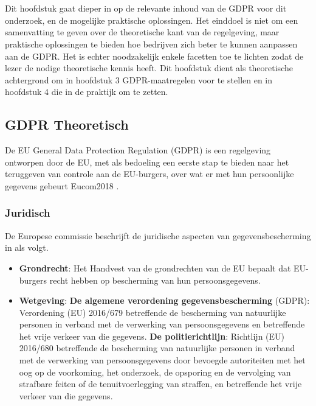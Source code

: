\chapter{}
\label{ch:stand-van-zaken}



Dit hoofdstuk gaat dieper in op de relevante inhoud van de GDPR voor dit onderzoek, en de mogelijke praktische oplossingen. 
Het einddoel is niet om een samenvatting te geven over de theoretische kant van de regelgeving, maar praktische oplossingen te bieden hoe bedrijven zich beter te kunnen aanpassen aan de GDPR. 
Het is echter noodzakelijk enkele facetten toe te lichten zodat de lezer de nodige theoretische kennis heeft.
Dit hoofdstuk dient als theoretische achtergrond om in hoofdstuk 3 GDPR-maatregelen voor te stellen en in hoofdstuk 4 die in de praktijk om te zetten.
 
 
\section{{GDPR Theoretisch}}

De EU General Data Protection Regulation (GDPR) is een regelgeving ontworpen door de EU, met als bedoeling een eerste stap te bieden naar het teruggeven van controle aan de EU-burgers, over wat er met hun persoonlijke gegevens gebeurt Eucom2018 . 

\subsection{Juridisch}
De Europese commissie beschrijft de juridische aspecten van gegevensbescherming in \autocite{Lusignan2014} als volgt.

\begin{itemize}
    \item \textbf{Grondrecht}: Het Handvest van de grondrechten van de EU bepaalt dat EU-burgers recht hebben op bescherming van hun persoonsgegevens.
    \item \textbf{Wetgeving}: 
    \subitem \textbf{De algemene verordening gegevensbescherming} (GDPR): 
    Verordening (EU) 2016/679 betreffende de bescherming van natuurlijke personen in verband met de verwerking van persoonsgegevens en betreffende het vrije verkeer van die gegevens.
    \subitem \textbf{De politierichtlijn}: 
    Richtlijn (EU) 2016/680 betreffende de bescherming van natuurlijke personen in verband met de verwerking van persoonsgegevens door bevoegde autoriteiten met het oog op de voorkoming, het onderzoek, de opsporing en de vervolging van strafbare feiten of de tenuitvoerlegging van straffen, en betreffende het vrije verkeer van die gegevens.
   
\end{itemize}

